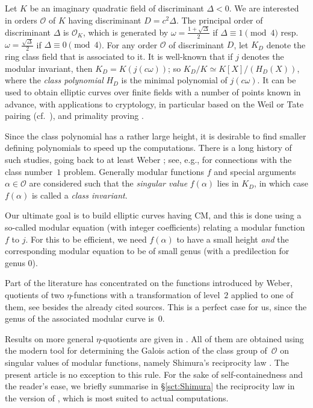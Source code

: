 \documentclass[12pt,twoside,leqno]{article}
\numberwithin{equation}{section}
\newcommand{\OO}{\mathcal O}
\newcommand{\OK}{\mathcal{O}_{\K}}
\newcommand{\K}{K}
\begin{document}
Let $\K$ be an imaginary quadratic field of discriminant $\Delta <
0$. We are interested in orders $\OO$ of $\K$ having
discriminant $D = c^2 \Delta$. The principal order of discriminant
$\Delta$ is $\OK$, which is
generated by $\omega = \frac {1 + \sqrt \Delta}{2}$ if
$\Delta \equiv 1 \pmod 4$
resp. $\omega = \frac {\sqrt \Delta}{2}$ if $\Delta \equiv 0 \pmod 4$.
For any order $\OO$ of discriminant $D$, let $\K_D$ denote
the ring class field that is associated to it. It is well-known that
if $j$ denotes the modular invariant, then
$\K_D = \K(j(c \omega))$; so $\K_D/\K \simeq
\K[X]/(H_D(X))$, where the \textit {class polynomial} $H_D$
is the minimal polynomial of $j (c \omega)$.
It can be used to obtain elliptic curves over finite fields with a
number of points known in advance, with applications to cryptology,
in particular based on the Weil or Tate pairing
(cf.~\cite{FrScTe10}), and primality proving \cite{AtMo93}.

Since the class polynomial has a rather large height, it is
desirable to find smaller defining polynomials to speed up the computations.
There is a long history of such studies, going back to at least Weber
\cite{Weber02-III}; see, e.g., \cite{Birch69,Stark69,Meyer70} for
connections with the class number~$1$ problem.
Generally modular functions $f$ and special arguments $\alpha \in \OO$
are considered such that the \emph {singular value} $f(\alpha)$
lies in $\K_D$, in which case $f (\alpha)$ is called a
\textit {class invariant}.

Our ultimate goal is to build elliptic curves having CM, and this is
done using a so-called modular equation (with integer coefficients)
relating a modular function $f$ to $j$. For this to be efficient, we
need $f (\alpha)$ to have a small height {\em and} the corresponding modular
equation to be of small genus (with a predilection for genus $0$).

Part of the literature has concentrated on the functions
introduced by Weber, quotients of two $\eta$-functions with a transformation
of level~$2$ applied to one of them, see
\cite {Schertz76,Gee99,GeSt98,Schertz02} besides the already cited
sources. This is a perfect case for us, since the genus of the
associated modular curve is~$0$.

Results on more general $\eta$-quotients are given in
\cite{Hajir93,Hajir93b,HaVi97,Gee99,EnSc04,EnSc12}.
All of them are obtained using the modern tool for determining the Galois
action of the class group of~$\OO$ on singular values of modular functions,
namely Shimura's reciprocity law \cite{Shimura71}.
The present article is no exception to this rule.
For the sake of self-containedness and the reader's ease, we briefly
summarise in \S\ref{sct:Shimura} the reciprocity law in the version
of \cite{Schertz02}, which is most suited to actual computations.
\end{document}
